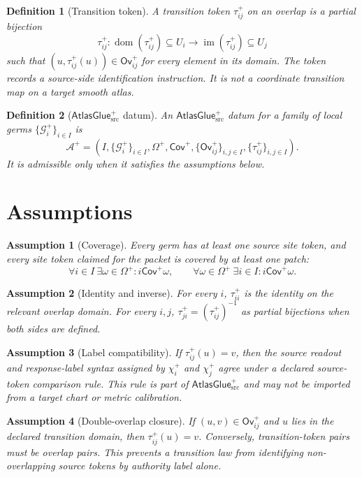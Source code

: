 \documentclass[11pt]{article}
\newcommand{\AtlasGlue}{\mathsf{AtlasGlue}_{\mathrm{src}}^{+}}
\newcommand{\Cov}{\mathsf{Cov}^{+}}
\newcommand{\Ov}{\mathsf{Ov}^{+}}
\newcommand{\Germ}{\mathcal{G}^{+}}
\newtheorem{definition}{Definition}
\newtheorem{assumption}{Assumption}
\begin{document}
\begin{definition}[Transition token]
A transition token \(\tau_{ij}^+\) on an overlap is a partial bijection
\[
  \tau_{ij}^+:\operatorname{dom}(\tau_{ij}^+)\subseteq U_i
  \longrightarrow
  \operatorname{im}(\tau_{ij}^+)\subseteq U_j
\]
such that \((u,\tau_{ij}^+(u))\in \Ov_{ij}\) for every element in its domain.
The token records a source-side identification instruction. It is not a
coordinate transition map on a target smooth atlas.
\end{definition}

\begin{definition}[\(\AtlasGlue\) datum]
An \(\AtlasGlue\) datum for a family of local germs
\(\{\Germ_i\}_{i\in I}\) is
\[
  \mathcal A^+ =
  (I,\{\Germ_i\}_{i\in I},\Omega^+,\Cov,\{\Ov_{ij}\}_{i,j\in I},
  \{\tau_{ij}^+\}_{i,j\in I}).
\]
It is admissible only when it satisfies the assumptions below.
\end{definition}

\section{Assumptions}

\begin{assumption}[Coverage]
Every germ has at least one source site token, and every site token claimed
for the packet is covered by at least one patch:
\[
  \forall i\in I\ \exists\omega\in\Omega^+: i\Cov\omega,
  \qquad
  \forall\omega\in\Omega^+\ \exists i\in I: i\Cov\omega .
\]
\end{assumption}

\begin{assumption}[Identity and inverse]
For every \(i\), \(\tau_{ii}^+\) is the identity on the relevant overlap
domain. For every \(i,j\), \(\tau_{ji}^+=(\tau_{ij}^+)^{-1}\) as partial
bijections when both sides are defined.
\end{assumption}

\begin{assumption}[Label compatibility]
If \(\tau_{ij}^+(u)=v\), then the source readout and response-label syntax
assigned by \(\chi_i^+\) and \(\chi_j^+\) agree under a declared source-token
comparison rule. This rule is part of \(\AtlasGlue\) and may not be imported
from a target chart or metric calibration.
\end{assumption}

\begin{assumption}[Double-overlap closure]
If \((u,v)\in\Ov_{ij}\) and \(u\) lies in the declared transition domain,
then \(\tau_{ij}^+(u)=v\). Conversely, transition-token pairs must be overlap
pairs. This prevents a transition law from identifying non-overlapping source
tokens by authority label alone.
\end{assumption}
\end{document}
